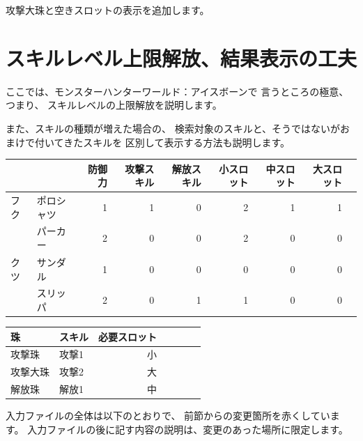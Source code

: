 \documentclass[dvipdfmx]{jsarticle}
\begin{document}
攻撃大珠と空きスロットの表示を追加します。

\section{スキルレベル上限解放、結果表示の工夫} %
ここでは、モンスターハンターワールド：アイスボーンで
言うところの極意、つまり、
スキルレベルの上限解放を説明します。

また、スキルの種類が増えた場合の、
検索対象のスキルと、そうではないがおまけで付いてきたスキルを
区別して表示する方法も説明します。
\medskip
%
\begin{center}
\begin{tabular}{llrrrrrrr}
\toprule
&& 防御力 & 攻撃スキル & 解放スキル & 小スロット& 中スロット& 大スロット\\
\midrule
フク
& ポロシャツ & 1 & 1 & 0 & 2 & 1 & 1\\
& パーカー   & 2 & 0 & 0 & 2 & 0 & 0\\
\midrule
クツ
& サンダル & 1 & 0 & 0 & 0 & 0 & 0\\
& スリッパ & 2 & 0 & 1 & 1 & 0 & 0\\
\bottomrule
\end{tabular}
\end{center}
%
\begin{center}
\begin{tabular}{llrrrrr}
\toprule
珠 & スキル & 必要スロット \\
\midrule
攻撃珠 & 攻撃1 & 小\\
攻撃大珠 & 攻撃2 & 大\\
解放珠 & 解放1 & 中\\
\bottomrule
\end{tabular}
\end{center}
%
入力ファイルの全体は以下のとおりで、
前節からの変更箇所を赤くしています。
入力ファイルの後に記す内容の説明は、変更のあった場所に限定します。
\medskip
\end{document}
